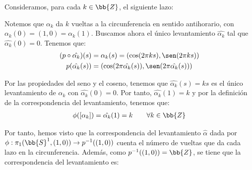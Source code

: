 \begin{ejemplo}
    Consideramos, para cada $k\in \bb{Z}$, el siguiente lazo:

    Notemos que $\alpha_k$ da $k$ vueltas a la circunferencia en sentido antihorario, con $\alpha_k(0)=(1,0)=\alpha_k(1)$. Buscamos ahora el único levantamiento $\hat{\alpha_k}$ tal que $\hat{\alpha_k}(0)=0$. Tenemos que:
    \begin{align*}
        (p\circ \hat{\alpha_k})(s) &= \alpha_k(s)
        = (\cos(2\pi ks), \sen(2\pi ks))\\
        p(\hat{\alpha_k}(s)) &= (\cos(2\pi \hat{\alpha_k}(s)), \sen(2\pi \hat{\alpha_k}(s)))\\
    \end{align*}

    Por las propiedades del seno y el coseno, tenemos que $\hat{\alpha_k}(s) = ks$ es el único levantamiento de $\alpha_k$ con $\hat{\alpha_k}(0)=0$. Por tanto, $\hat{\alpha_k}(1) = k$ y por la definición de la correspondencia del levantamiento, tenemos que:
    \begin{gather*}
        \phi([\alpha_k]) = \hat{\alpha_k}(1) = k\qquad \forall k\in \bb{Z}
    \end{gather*}

    Por tanto, hemos visto que la correspondencia del levantamiento $\widehat{\alpha}$ dada por $\phi:\pi_1(\bb{S}^1, (1,0))\to p^{-1}((1,0))$ cuenta el número de vueltas que da cada lazo en la circunferencia. Además, como $p^{-1}((1,0))=\bb{Z}$, se tiene que la correspondencia del levantamiento es:
\end{ejemplo}

